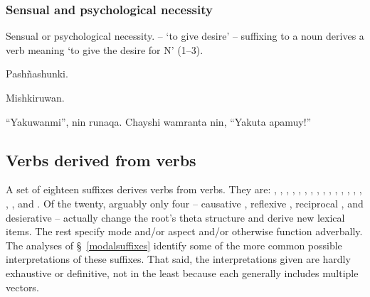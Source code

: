 \subsubsection{Sensual and psychological necessity }\label{ssec:senspsy}
Sensual or psychological necessity.  -- `to give desire' -- suffixing to a noun derives a verb meaning `to give the desire for N' (1--3).

%
{Pash\~nashunki.\dag{}}%
{}%
{}{}%

%
{Mishkiruwan.}%
{}%
{}{}%

%
{``Yakuwanmi'', nin runaqa. Chayshi wamranta nin, ``\textexclamdown{}Yakuta apamuy!''}%
{}%
{}{}%

\subsection{Verbs derived from verbs}\label{VDfV}
A set of eighteen suffixes derives verbs from verbs. They are: , , , , , , , , , , , , , , , , , and . Of the twenty, arguably only four -- causative , reflexive , reciprocal , and desierative  -- actually change the root's theta structure and derive new lexical items. The rest specify mode and/or aspect and/or otherwise function adverbally. The analyses of \S~\ref{modalsuffixes} identify some of the more common possible interpretations of these suffixes. That said, the interpretations given are hardly exhaustive or definitive, not in the least because each generally includes multiple vectors. 

